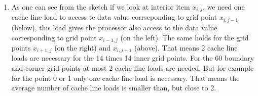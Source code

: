 \documentclass{article}
\begin{document}
\begin{enumerate}[label=(\alph*)]
    \item 
 As one can see from the sketch if we look at interior item $x_{i,j}$, we need one cache line load to access te data value corrseponding to grid point $x_{i,j-1}$ (below),  this load gives the processor also access to the data value corresponding to grid point $x_{i-1,j}$ (on the left). The same holds for the grid points $x_{i+1,j}$ (on the right) and $x_{i,j+1}$ (above). That means 2 cache line loads are necessary for the 14 times 14 inner grid points.
\newline
For the 60 boundary and corner grid points at most 2 cache line loads are needed. But for example for the point 0 or 1 only one cache line load is necessary.
\newline
That means the average number of cache line loads is smaller than, but close to 2. 
\newpage

\end{enumerate}
\end{document}
